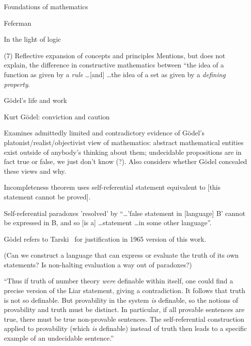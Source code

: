 \begin{plSection}{Foundations of mathematics}
\begin{plSection}{Feferman}
\begin{plSection}{In the light of logic}
\begin{plSection}{(7) Reflective expansion of concepts and principles}
Mentions, but does not explain, the difference 
in constructive mathematics between
``the idea of a function as given by a \textit{rule}
\ldots [and] \ldots the idea of a set as given by a 
\textit{defining property}.~\cite{Feferman:1979:ConstructiveFunctionsClasses}

\end{plSection}%
\begin{plSection}{G\"{o}del's life and work}
\label{sec:Godels_life_and_work}

\cite[ch~6 ``G\"{o}del's life and work'']{Feferman:1998:LightOfLogic}

\end{plSection}%
\begin{plSection}{Kurt G\"{o}del: conviction and caution}
\label{sec:Kurt_Godel_conviction_and_caution}

Examines admittedly limited and contradictory evidence
of G\"{o}del's platonist/realist/objectivist view of
mathematics: abstract mathematical entities exist outside 
of anybody's thinking about them;
undecidable propositions are in fact true or false, we just don't
know (?).
Also considers whether G\"{o}del concealed these views and 
why.~\cite[ch~7 ``Kurt G\"{o}del: conviction and caution'']{Feferman:1998:LightOfLogic}

Incompleteness theorem uses self-referential statement
equivalent to [this statement cannot be 
proved].~\cite[p~156]{Feferman:1998:LightOfLogic}

Self-referential paradoxes 'resolved' by 
``\ldots 'false statement in [language] B' cannot be expressed in
B, and so [is a] \ldots statement \ldots in some other 
language''.~\cite[p~157]{Feferman:1998:LightOfLogic}

G\"{o}del refers to 
Tarski~\cite{Tarski1944:SemanticTruth,Tarski:1983:LogicEtc} 
for justification in 1965 version 
of this work.~\cite{Godel:1986:CollectedWorksI}
 
(Can we construct a language that can express 
or evaluate the truth of 
its own statements? 
Is non-halting evaluation a way out of paradoxes?)

``Thus if truth of number theory \textit{were}
definable within itself, one could find a precise version of the
Liar statement, giving a contradiction.
It follows that truth is not so definable.
But provability in the system \textit{is} definable,
so the notions of provability and truth must be distinct.
In particular, if all provable sentences are true,
there must be true non-provable sentences.
The self-referential construction applied to provability
(which \textit{is} definable) instead of truth then 
leads to a specific example of an undecidable 
sentence.''~\cite[p~159]{Feferman:1998:LightOfLogic}


\end{plSection}
\end{plSection}
\end{plSection}
\end{plSection}
